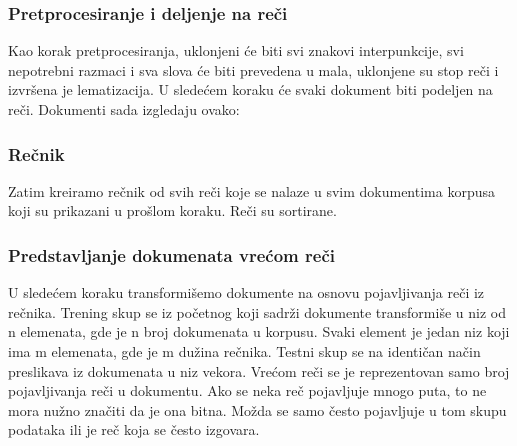 \documentclass[12pt,oneside]{memoir}
\begin{document}
\subsubsection{Pretprocesiranje i deljenje na reči}
Kao korak pretprocesiranja,  uklonjeni će biti svi znakovi interpunkcije,  svi nepotrebni razmaci i sva slova će biti prevedena u mala,  uklonjene su stop reči i izvršena je lematizacija. U sledećem koraku će svaki dokument biti podeljen na reči.  Dokumenti sada izgledaju ovako:
\newline
\newline
\noindent{}
\newline
\subsubsection{Rečnik}
Zatim kreiramo rečnik od svih reči koje se nalaze u svim dokumentima korpusa koji su prikazani u prošlom koraku.  Reči su sortirane. 
\newline
\newline
\noindent{}
\newline
\subsubsection{Predstavljanje dokumenata vrećom reči}
U sledećem koraku transformišemo dokumente na osnovu pojavljivanja reči iz rečnika. 
\newline
\newline
\noindent{}
\newline
Trening skup se iz početnog koji sadrži dokumente transformiše u niz od n elemenata, gde je n broj dokumenata u korpusu.  Svaki element je jedan niz koji ima m elemenata, gde je m dužina rečnika.  Testni skup se na identičan način preslikava iz dokumenata u niz vekora.  
Vrećom reči se je reprezentovan samo broj pojavljivanja reči u dokumentu.  Ako se neka reč pojavljuje mnogo puta, to ne mora nužno značiti da je ona bitna.  Možda se samo često pojavljuje u tom skupu podataka ili je reč koja se često izgovara.
\end{document}
